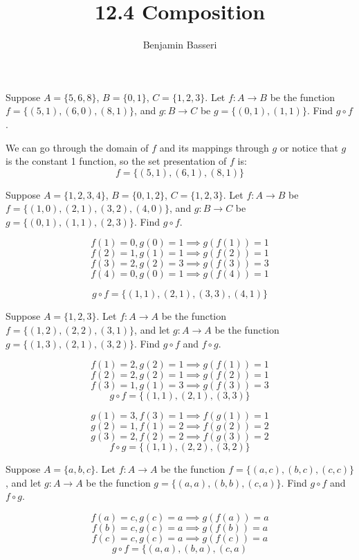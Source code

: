\documentclass{article}
\title{12.4 Composition}
\author{Benjamin Basseri}
\begin{document}
\maketitle

\begin{problem}
Suppose $A = \{5, 6, 8\}$, $B = \{0, 1\}$, $C = \{1, 2, 3\}$. Let $f : A \to B$ be the function $f = \{(5, 1), (6, 0), (8, 1)\}$, and $g : B \to C$ be $g = \{(0, 1), (1, 1)\}$. Find $g \circ f$.
\end{problem}

We can go through the domain of $f$ and its mappings through $g$ or notice that $g$ is the constant 1 function, so the set presentation of $f$ is:
$$f = \{(5, 1), (6, 1), (8, 1)\}$$

\begin{problem}
Suppose $A = \{1, 2, 3, 4\}$, $B = \{0, 1, 2\}$, $C = \{1, 2, 3\}$. Let $f : A \to B$ be $f = \{(1, 0), (2, 1), (3, 2), (4, 0)\}$, and $g : B \to C$ be $g = \{(0, 1), (1, 1), (2, 3)\}$. Find $g \circ f$.
\end{problem}

$$f(1) = 0, g(0) = 1 \implies g(f(1)) = 1$$
$$f(2) = 1, g(1) = 1 \implies g(f(2)) = 1$$
$$f(3) = 2, g(2) = 3 \implies g(f(3)) = 3$$
$$f(4) = 0, g(0) = 1 \implies g(f(4)) = 1$$

$$g\circ f = \{(1, 1), (2, 1), (3, 3), (4, 1)\}$$

\begin{problem}
Suppose $A = \{1, 2, 3\}$. Let $f : A \to A$ be the function $f = \{(1, 2), (2, 2), (3, 1)\}$, and let $g : A \to A$ be the function $g = \{(1, 3), (2, 1), (3, 2)\}$. Find $g \circ f$ and $f \circ g$.
\end{problem}

$$f(1) = 2, g(2) = 1 \implies g(f(1)) =1$$
$$f(2) = 2, g(2) = 1 \implies g(f(2)) = 1$$
$$f(3) = 1, g(1) = 3 \implies g(f(3)) = 3$$
$$g\circ f = \{(1, 1), (2, 1), (3, 3)\}$$

$$g(1) = 3, f(3) = 1 \implies f(g(1)) = 1$$
$$g(2) = 1, f(1) = 2 \implies f(g(2)) = 2$$
$$g(3) = 2, f(2) = 2 \implies f(g(3)) = 2$$
$$f\circ g = \{(1, 1), (2, 2), (3, 2)\}$$

\begin{problem}
Suppose $A = \{a, b, c\}$. Let $f : A \to A$ be the function $f = \{(a, c), (b, c), (c, c)\}$, and let $g : A \to A$ be the function $g = \{(a, a), (b, b), (c, a)\}$. Find $g \circ f$ and $f \circ g$.
\end{problem}

$$f(a) = c, g(c) = a \implies g(f(a)) = a$$
$$f(b) = c, g(c) = a \implies g(f(b)) = a$$
$$f(c) = c, g(c) = a \implies g(f(c)) = a$$
$$g \circ f = \{(a, a), (b, a), (c, a)$$
\end{document}

